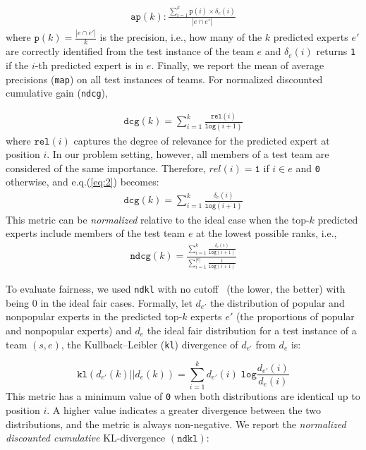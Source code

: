 \documentclass[runningheads]{llncs}
\begin{document}
\begin{align}
\texttt{ap}(k):\frac{\sum_{i=1}^{k}\texttt{p}(i)\times \delta_{e}(i)}{|{e}\cap e'|}
\end{align}
where $\texttt{p}(k)=\frac{|e\cap e'|}{k}$ is the precision, i.e., how many of the $k$ predicted experts $e'$ are correctly identified from the test instance of the team $e$ and $\delta_{e}(i)$ returns \texttt{1} if the $i$-th predicted expert is in $e$. Finally, we report the mean of average precisions  (\texttt{map}) on all test instances of teams. For normalized discounted cumulative gain (\texttt{ndcg}), 

\begin{align}
 \texttt{dcg}(k)=\sum_{i=1}^{k}\frac{\texttt{rel}(i)}{\texttt{log} (i+1)} \label{eq:2}
\end{align}
where $\texttt{rel}(i)$ captures the degree of relevance for the predicted expert at position $i$. In our problem setting, however, all members of a test team are considered of the same importance. Therefore, $rel(i)=\texttt{1}$ if $i \in e$ and \texttt{0} otherwise, and e.q.(\ref{eq:2}) becomes:
\begin{align}
\texttt{dcg}(k)=\sum_{i=1}^{k}\frac{\delta_{e}(i)}{\texttt{log}(i+1)} 
\end{align}
This metric can be {\it normalized} relative to the ideal case when the top-$k$ predicted experts include members of the test team $e$ at the lowest possible ranks, i.e.,
\begin{align}
\texttt{ndcg}(k)=\frac{\sum_{i=1}^{k}\frac{\delta_{e}(i)}{\texttt{log}(i+1)}}{\sum_{i=1}^{|e|}\frac{1}{\texttt{log}(i+1)}}
\end{align}

To evaluate fairness, we used \texttt{ndkl} with no cutoff~\cite{DBLP:conf/kdd/GeyikAK19} (the lower, the better) with being 0 in the ideal fair cases. Formally, let $d_{e'}$ the distribution of popular and nonpopular experts in the predicted top-$k$ experts $e'$ (the proportions of popular and nonpopular experts) and $d_e$ the ideal fair distribution for a test instance of a team $(s, e)$, the Kullback–Leibler (\texttt{kl}) divergence of $d_{e'}$ from $d_{e}$ is:

\begin{equation}
\texttt{kl}(d_{e'}(k)||d_e(k)) = \sum_{i=1}^{k} d_{e'}(i) \;\texttt{log} \frac{d_{e'}(i)}{d_e(i)}
\end{equation}
This metric has a minimum value of \texttt{0} when both distributions are identical up to position $i$. A higher value indicates a greater divergence between the two distributions, and the metric is always non-negative. We report the \textit{normalized  discounted cumulative} KL-divergence $(\texttt{ndkl})$\cite{DBLP:conf/kdd/GeyikAK19}:
\end{document}
